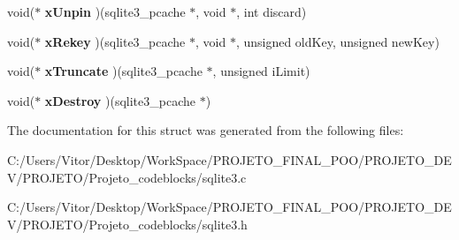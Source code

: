 \begin{DoxyCompactItemize}
\item 
\hypertarget{structsqlite3__pcache__methods_ade2ab50cc6896be03ee86541877fa85e}{void($\ast$ {\bfseries x\-Unpin} )(sqlite3\-\_\-pcache $\ast$, void $\ast$, int discard)}\label{structsqlite3__pcache__methods_ade2ab50cc6896be03ee86541877fa85e}

\item 
\hypertarget{structsqlite3__pcache__methods_adc5552190f1de86eb95d91e9cf8430e6}{void($\ast$ {\bfseries x\-Rekey} )(sqlite3\-\_\-pcache $\ast$, void $\ast$, unsigned old\-Key, unsigned new\-Key)}\label{structsqlite3__pcache__methods_adc5552190f1de86eb95d91e9cf8430e6}

\item 
\hypertarget{structsqlite3__pcache__methods_aad73f9335999770bcd2dc6a2d914b4f0}{void($\ast$ {\bfseries x\-Truncate} )(sqlite3\-\_\-pcache $\ast$, unsigned i\-Limit)}\label{structsqlite3__pcache__methods_aad73f9335999770bcd2dc6a2d914b4f0}

\item 
\hypertarget{structsqlite3__pcache__methods_aac18fc581d8d63550a6657016c24ba5d}{void($\ast$ {\bfseries x\-Destroy} )(sqlite3\-\_\-pcache $\ast$)}\label{structsqlite3__pcache__methods_aac18fc581d8d63550a6657016c24ba5d}

\end{DoxyCompactItemize}


The documentation for this struct was generated from the following files\-:\begin{DoxyCompactItemize}
\item 
C\-:/\-Users/\-Vitor/\-Desktop/\-Work\-Space/\-P\-R\-O\-J\-E\-T\-O\-\_\-\-F\-I\-N\-A\-L\-\_\-\-P\-O\-O/\-P\-R\-O\-J\-E\-T\-O\-\_\-\-D\-E\-V/\-P\-R\-O\-J\-E\-T\-O/\-Projeto\-\_\-codeblocks/sqlite3.\-c\item 
C\-:/\-Users/\-Vitor/\-Desktop/\-Work\-Space/\-P\-R\-O\-J\-E\-T\-O\-\_\-\-F\-I\-N\-A\-L\-\_\-\-P\-O\-O/\-P\-R\-O\-J\-E\-T\-O\-\_\-\-D\-E\-V/\-P\-R\-O\-J\-E\-T\-O/\-Projeto\-\_\-codeblocks/sqlite3.\-h\end{DoxyCompactItemize}
